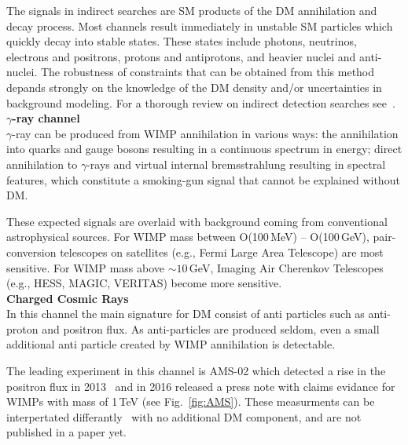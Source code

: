 The signals in indirect searches are SM products of the DM annihilation and decay process. Most channels result immediately in unstable SM particles which quickly decay into stable states. These states include photons, neutrinos, electrons and positrons, protons and antiprotons, and heavier nuclei and anti-nuclei. The robustness of constraints that can be obtained from this method depands strongly on the knowledge of the DM density and/or uncertainties in background modeling. For a thorough review on indirect detection searches see~\cite{Conrad:2014tla}.\\

	\textbf{$\gamma$-ray channel}\\

$\gamma$-ray can be produced from WIMP annihilation in various ways: the annihilation into quarks and gauge bosons resulting in a continuous spectrum in energy; direct annihilation to $\gamma$-rays and virtual internal bremsstrahlung resulting in spectral features, which constitute a smoking-gun signal that cannot be explained without DM.

These expected signals are overlaid with background coming from conventional astrophysical sources. For WIMP mass between O(100\,MeV) -- O(100\,GeV), pair-conversion telescopes on satellites (e.g., Fermi Large Area Telescope) are most sensitive. For WIMP mass above $\sim 10$\,GeV, Imaging Air Cherenkov Telescopes (e.g., HESS, MAGIC, VERITAS) become more sensitive.\\

\textbf{Charged Cosmic Rays}\\

In this channel the main signature for DM consist of anti particles such as anti-proton and positron flux. As anti-particles are produced seldom, even a small additional anti particle created by WIMP annihilation is detectable.

The leading experiment in this channel is AMS-02 which detected a rise in the positron flux in 2013~\cite{Aguilar:2013qda} and in 2016 released a press note with claims evidance for WIMPs with mass of 1\,TeV (see Fig.~\ref{fig:AMS}). These measurments can be interpertated differantly~\cite{Blum:2013zsa} with no additional DM component, and are not published in a paper yet. \\

